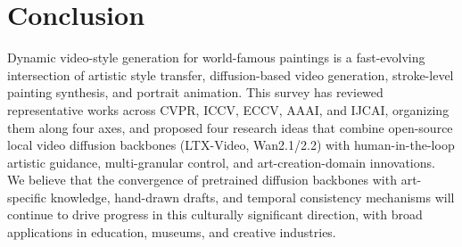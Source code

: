 \section{Conclusion}
\label{sec:conclusion}

Dynamic video-style generation for world-famous paintings is a fast-evolving intersection
of artistic style transfer, diffusion-based video generation, stroke-level painting
synthesis, and portrait animation. This survey has reviewed representative works across
CVPR, ICCV, ECCV, AAAI, and IJCAI, organizing them along four axes, and proposed four
research ideas that combine open-source local video diffusion backbones (LTX-Video,
Wan2.1/2.2) with human-in-the-loop artistic guidance, multi-granular control, and
art-creation-domain innovations. We believe that the convergence of pretrained
diffusion backbones with art-specific knowledge, hand-drawn drafts, and temporal
consistency mechanisms will continue to drive progress in this culturally significant
direction, with broad applications in education, museums, and creative industries.
